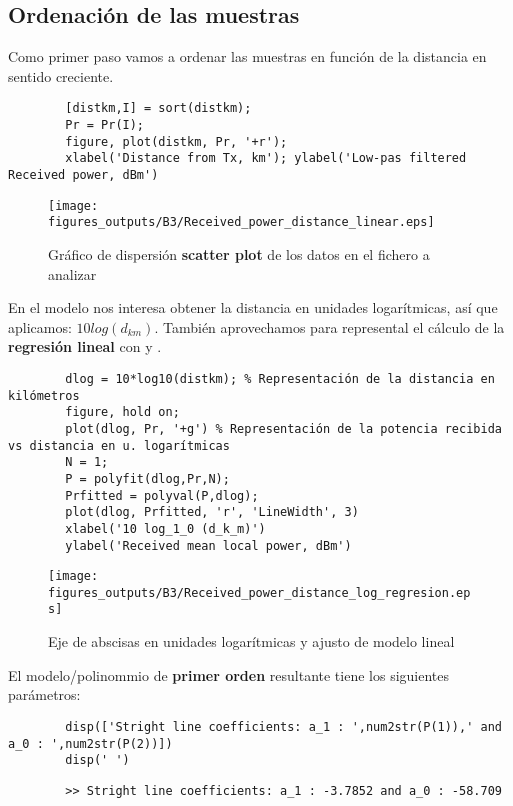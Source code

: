 \documentclass{article}
\begin{document}
\subsection{Ordenación de las muestras}
    \par Como primer paso vamos a ordenar las muestras en función de la distancia en sentido creciente.
    \begin{lstlisting}
        [distkm,I] = sort(distkm);
        Pr = Pr(I);
        figure, plot(distkm, Pr, '+r');
        xlabel('Distance from Tx, km'); ylabel('Low-pas filtered Received power, dBm')
    \end{lstlisting}
    \begin{figure}[h]
        \centering
        \texttt{[image: figures\_outputs/B3/Received\_power\_distance\_linear.eps]}
        \caption{Gráfico de dispersión \textbf{scatter plot} de los datos en el fichero a analizar}
        \label{fig:my_label}
    \end{figure}
    \clearpage
    \par En el modelo nos interesa obtener la distancia en unidades logarítmicas, así que aplicamos: $10log(d_{km}) $. También aprovechamos para represental el cálculo de la \textbf{regresión lineal} con  y .
    \begin{lstlisting}
        dlog = 10*log10(distkm); % Representación de la distancia en kilómetros
        figure, hold on; 
        plot(dlog, Pr, '+g') % Representación de la potencia recibida vs distancia en u. logarítmicas
        N = 1;
        P = polyfit(dlog,Pr,N);
        Prfitted = polyval(P,dlog);
        plot(dlog, Prfitted, 'r', 'LineWidth', 3)
        xlabel('10 log_1_0 (d_k_m)')
        ylabel('Received mean local power, dBm')
    \end{lstlisting}
    \begin{figure}[h]
        \centering
        \texttt{[image: figures\_outputs/B3/Received\_power\_distance\_log\_regresion.eps]}
        \caption{Eje de abscisas en unidades logarítmicas y ajusto de modelo lineal}
        \label{fig:my_label}
    \end{figure}
    \par El modelo/polinommio de \textbf{primer orden} resultante tiene los siguientes parámetros:
    \begin{lstlisting}
        disp(['Stright line coefficients: a_1 : ',num2str(P(1)),' and a_0 : ',num2str(P(2))])
        disp(' ')
    \end{lstlisting}
    \begin{verbatim}
        >> Stright line coefficients: a_1 : -3.7852 and a_0 : -58.709
    \end{verbatim}
\end{document}
